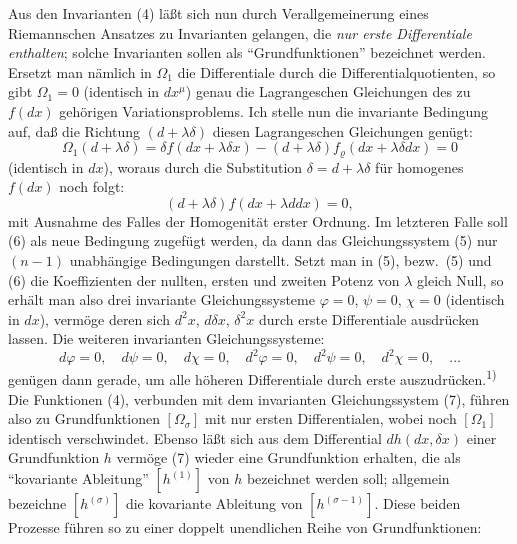 \documentclass[12pt,a4paper]{article}
\begin{document}
Aus den Invarianten (4) l\"a\ss{}t sich nun durch Verallgemeinerung eines Riemannschen Ansatzes zu Invarianten gelangen, die \emph{nur erste Differentiale enthalten}; solche Invarianten sollen als ``Grundfunktionen'' bezeichnet werden. Ersetzt man n\"amlich in $\varOmega_{1}$ die Differentiale durch die Differentialquotienten, so gibt $\varOmega_{1}=0$ (identisch in $dx^{\mu}$) genau die Lagrangeschen Gleichungen des zu $f(dx)$ geh\"origen Variationsproblems. Ich stelle nun die invariante Bedingung auf, da\ss{} die Richtung $(d+\lambda\delta)$ diesen Lagrangeschen Gleichungen gen\"ugt:
\begin{equation}\tag{5}
\varOmega_{1}(d+\lambda\delta)=\delta f(dx+\lambda\delta x)-(d+\lambda\delta)f_{\varrho}(dx+\lambda\delta dx)=0
\end{equation}
(identisch in $dx$), woraus durch die Substitution $\delta=d+\lambda\delta$ f\"ur homogenes $f(dx)$ noch folgt:
\begin{equation}\tag{6}
(d+\lambda\delta)f(dx+\lambda ddx)=0,
\end{equation}
mit Ausnahme des Falles der Homogenit\"at erster Ordnung. Im letzteren Falle soll (6) als neue Bedingung zugef\"ugt werden, da dann das Gleichungssystem (5) nur $(n-1)$ unabh\"angige Bedingungen darstellt. Setzt man in (5), bezw.\ (5) und (6) die Koeffizienten der nullten, ersten und zweiten Potenz von $\lambda$ gleich Null, so erh\"alt man also drei invariante Gleichungssysteme $\varphi=0$, $\psi=0$, $\chi=0$ (identisch in $dx$), verm\"oge deren sich $d^{2}x$, $d\delta x$, $\delta^{2}x$ durch erste Differentiale ausdr\"ucken lassen. Die weiteren invarianten Gleichungssysteme:
\begin{equation}\tag{7}
d\varphi=0,\quad d\psi=0,\quad d\chi=0,\quad d^{2}\varphi=0,\quad d^{2}\psi=0,\quad d^{2}\chi=0,\quad\ldots
\end{equation}
gen\"ugen dann gerade, um alle h\"oheren Differentiale durch erste auszudr\"ucken.\textsuperscript{1)} Die Funktionen (4), verbunden mit dem invarianten Gleichungssystem (7), f\"uhren also zu Grundfunktionen $[\varOmega_{\sigma}]$ mit nur ersten Differentialen, wobei noch $[\varOmega_{1}]$ identisch verschwindet. Ebenso l\"a\ss{}t sich aus dem Differential $dh(dx,\delta x)$ einer Grundfunktion $h$ verm\"oge (7) wieder eine Grundfunktion erhalten, die als ``kovariante Ableitung'' $[h^{(1)}]$ von $h$ bezeichnet werden soll; allgemein bezeichne $[h^{(\sigma)}]$ die kovariante Ableitung von $[h^{(\sigma-1)}]$. Diese beiden Prozesse f\"uhren so zu einer doppelt unendlichen Reihe von Grundfunktionen:
\end{document}
